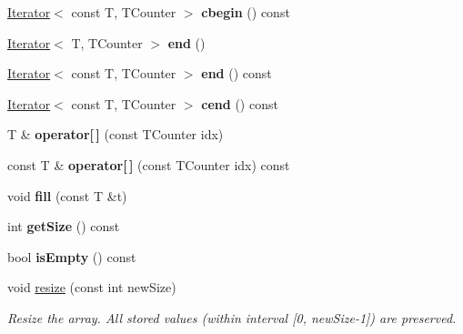 \begin{DoxyCompactItemize}
\item 
\hypertarget{classArray_a751a6999d94a005be83344c131196ac4}{}\label{classArray_a751a6999d94a005be83344c131196ac4} 
\hyperlink{classIterator}{Iterator}$<$ const T, T\+Counter $>$ {\bfseries cbegin} () const
\item 
\hypertarget{classArray_a79f668040fdf1ecf120ea8b2e5084190}{}\label{classArray_a79f668040fdf1ecf120ea8b2e5084190} 
\hyperlink{classIterator}{Iterator}$<$ T, T\+Counter $>$ {\bfseries end} ()
\item 
\hypertarget{classArray_ab607b1de02960ec3f282526be9aa1afc}{}\label{classArray_ab607b1de02960ec3f282526be9aa1afc} 
\hyperlink{classIterator}{Iterator}$<$ const T, T\+Counter $>$ {\bfseries end} () const
\item 
\hypertarget{classArray_afafcc1c1eb0da2e56e5a37a1456d9cb4}{}\label{classArray_afafcc1c1eb0da2e56e5a37a1456d9cb4} 
\hyperlink{classIterator}{Iterator}$<$ const T, T\+Counter $>$ {\bfseries cend} () const
\item 
\hypertarget{classArray_a8829af2d483c4e9ee2269a5deee6f042}{}\label{classArray_a8829af2d483c4e9ee2269a5deee6f042} 
T \& {\bfseries operator\mbox{[}$\,$\mbox{]}} (const T\+Counter idx)
\item 
\hypertarget{classArray_ad2d84eb9a3cd270c134ee915b280a27d}{}\label{classArray_ad2d84eb9a3cd270c134ee915b280a27d} 
const T \& {\bfseries operator\mbox{[}$\,$\mbox{]}} (const T\+Counter idx) const
\item 
\hypertarget{classArray_ad1690497f80539c2a92357d65b9a9d66}{}\label{classArray_ad1690497f80539c2a92357d65b9a9d66} 
void {\bfseries fill} (const T \&t)
\item 
\hypertarget{classArray_a02fc8237ecb8bd11ad35ec01824dfdcf}{}\label{classArray_a02fc8237ecb8bd11ad35ec01824dfdcf} 
int {\bfseries get\+Size} () const
\item 
\hypertarget{classArray_a6e420323d0af017e30f643876aecd0a6}{}\label{classArray_a6e420323d0af017e30f643876aecd0a6} 
bool {\bfseries is\+Empty} () const
\item 
\hypertarget{classArray_a790180f66bcedec3a38db50c2fadd84b}{}\label{classArray_a790180f66bcedec3a38db50c2fadd84b} 
void \hyperlink{classArray_a790180f66bcedec3a38db50c2fadd84b}{resize} (const int new\+Size)
\begin{DoxyCompactList}\small\item\em Resize the array. All stored values (within interval \mbox{[}0, new\+Size-\/1\mbox{]}) are preserved. \end{DoxyCompactList}\item 

\end{DoxyCompactItemize}
